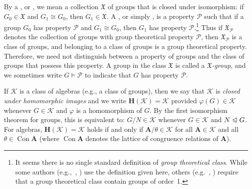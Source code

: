 \documentclass[11pt]{amsart}
\theoremstyle{plain}
\theoremstyle{definition}
\theoremstyle{remark}
\numberwithin{theorem}{section}
\numberwithin{claim}{section}
\numberwithin{equation}{section}
\numberwithin{conjecture}{section}
\newcommand{\<}{\ensuremath{\langle}}
\renewcommand{\>}{\ensuremath{\rangle}}
\newcommand{\subnormal}{\ensuremath{\trianglelefteqslant}}
\newcommand{\Con}{\ensuremath{\operatorname{Con}}}
\newcommand{\0}{\ensuremath{\mathbf{0}}}
\newcommand{\1}{\ensuremath{\mathbf{1}}}
\newcommand{\2}{\ensuremath{\mathbf{2}}}
\newcommand{\3}{\ensuremath{\mathbf{3}}}
\newcommand{\4}{\ensuremath{\mathbf{4}}}
\newcommand{\5}{\ensuremath{\mathbf{5}}}
\newcommand{\bA}{\ensuremath{\mathbf{A}}}
\newcommand{\sG}{\ensuremath{\mathfrak{X}}}
\newcommand{\bH}{\ensuremath{\mathbf{H}}}
\newcommand{\sK}{\ensuremath{\mathscr{K}}}
\newcommand{\cP}{\ensuremath{\mathcal{P}}}
\renewcommand{\phi}{\ensuremath{\varphi}}
\begin{document}
By a , or , we mean a
collection $\sG$ of groups that is closed under isomorphism:
if $G_0\in \sG$ and  $G_1\cong G_0$, then $G_1\in \sG$.
A , or simply ,
is a property $\cP$ such that if a group $G_0$ has property $\cP$ and
$G_1\cong G_0$, then $G_1$ has property $\cP$.\footnote{It seems there
  is no single standard definition of \emph{group theoretical class}.
  While some authors (e.g.,~\cite{Doerk:1992}, \cite{BBE:2006}) use the definition given here,
  others (e.g.~\cite{Robinson:1996}, \cite{Rose:1978}) require that a group
theoretical class contain groups of order~1.}  
Thus if $\sG_{\cP}$ denotes the collection of groups with group theoretical
property $\cP$, then  $\sG_{\cP}$  is a class of groups, and belonging to a
class of groups is a group theoretical property.  Therefore, we need not
distinguish between a property of groups and the class of groups that possess
this property.
A group in the class $\sG$ is called a 
\emph{$\sG$-group}, and 
we sometimes write $G \vDash \cP$ to indicate
that $G$ has property $\cP$. %

If $\sK$ is a class of algebras (e.g., a class of groups), then we say that
$\sK$ is \emph{closed under homomorphic images} and we write $\bH(\sK) = \sK$
provided $\phi(G)\in \sK$ whenever $G\in \sK$ and $\phi$ is a homomorphism of
$G$. By the first isomorphism theorem for
  groups, this is equivalent to: 
$G/N\in \sK$ whenever $G\in \sK$ and $N\subnormal G$.  For algebras, 
$\bH(\sK) = \sK$ holds if and only if $\bA/\theta \in \sK$ for all $\bA\in \sK$
  and all $\theta \in \Con\bA$ (where $\Con\bA$ denotes the lattice of
  congruence relations of $\bA$). 
\end{document}
